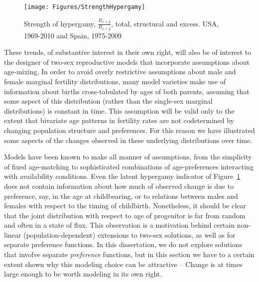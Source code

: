 \begin{figure}[!ht]
  \centering
    \caption{Strength of hypergamy, $\frac{B_{x>y}}{B_{x<y}}$, total, structural
    and excess. USA, 1969-2010 and Spain, 1975-2009}
    \texttt{[image: Figures/StrengthHypergamy]}      
    \label{fig:HypergamyStrength}
\end{figure}

These trends, of substantive interest in their own right, will also be of
interest to the designer of two-sex reproductive models that incorporate
 assumptions about age-mixing. In order to avoid overly restrictive
 assumptions about male and female marginal fertility distributions, many
 model varieties make use of information about births cross-tabulated by
 ages of both parents, assuming that some aspect of this distribution
 (rather than the single-sex marginal distributions) is constant in time.
 This assumption will be valid only to the extent that bivariate age patterns in
 fertility rates are not codetermined by changing population structure and
 preferences. For this reason we have illustrated some aspects of the changes 
 observed in these underlying distributions over time. 
 
Models have been
 known to make all manner of assumptions, from the simplicity of 
 fixed age-matching to sophisticated combinations of age-preferences 
 interacting with availability conditions. Even the latent hypergamy 
 indicator of Figure~\ref{fig:HypergamyStrength} does not contain information 
 about how much of observed change is due to preference, say, in the age at 
 childbearing, or to relations between males and females with respect to the
 timing of childbirth. Nonetheless, it should be clear that the joint distribution
with respect to age of progenitor is far from random and often in a state of
flux. This observation is a motivation behind certain non-linear
(population-dependent) extensions to two-sex solutions, as well as for separate
preference functions. In this dissertation, we do not explore solutions that
involve separate \textit{preference} functions, but in this section we have to a
certain extent shown why this modeling choice can be attractive -- Change is at
times large enough to be worth modeling in its own right.
